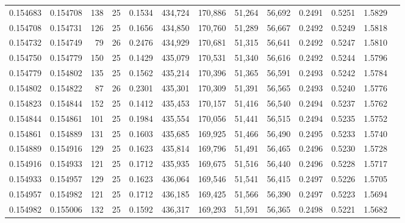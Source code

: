 \begin{tabular}{rrrrrrrrrrrrr}
0.154683 & 0.154708 & 138 &  25 &                                     0.1534 & 434,724 & 170,886 &  51,264 &  56,692 & 0.2491 & 0.5251 & 1.5829 \\
0.154708 & 0.154731 & 126 &  25 &                                     0.1656 & 434,850 & 170,760 &  51,289 &  56,667 & 0.2492 & 0.5249 & 1.5818 \\
0.154732 & 0.154749 &  79 &  26 &                                     0.2476 & 434,929 & 170,681 &  51,315 &  56,641 & 0.2492 & 0.5247 & 1.5810 \\
0.154750 & 0.154779 & 150 &  25 &                                     0.1429 & 435,079 & 170,531 &  51,340 &  56,616 & 0.2492 & 0.5244 & 1.5796 \\
0.154779 & 0.154802 & 135 &  25 &                                     0.1562 & 435,214 & 170,396 &  51,365 &  56,591 & 0.2493 & 0.5242 & 1.5784 \\
0.154802 & 0.154822 &  87 &  26 &                                     0.2301 & 435,301 & 170,309 &  51,391 &  56,565 & 0.2493 & 0.5240 & 1.5776 \\
0.154823 & 0.154844 & 152 &  25 &                                     0.1412 & 435,453 & 170,157 &  51,416 &  56,540 & 0.2494 & 0.5237 & 1.5762 \\
0.154844 & 0.154861 & 101 &  25 &                                     0.1984 & 435,554 & 170,056 &  51,441 &  56,515 & 0.2494 & 0.5235 & 1.5752 \\
0.154861 & 0.154889 & 131 &  25 &                                     0.1603 & 435,685 & 169,925 &  51,466 &  56,490 & 0.2495 & 0.5233 & 1.5740 \\
0.154889 & 0.154916 & 129 &  25 &                                     0.1623 & 435,814 & 169,796 &  51,491 &  56,465 & 0.2496 & 0.5230 & 1.5728 \\
0.154916 & 0.154933 & 121 &  25 &                                     0.1712 & 435,935 & 169,675 &  51,516 &  56,440 & 0.2496 & 0.5228 & 1.5717 \\
0.154933 & 0.154957 & 129 &  25 &                                     0.1623 & 436,064 & 169,546 &  51,541 &  56,415 & 0.2497 & 0.5226 & 1.5705 \\
0.154957 & 0.154982 & 121 &  25 &                                     0.1712 & 436,185 & 169,425 &  51,566 &  56,390 & 0.2497 & 0.5223 & 1.5694 \\
0.154982 & 0.155006 & 132 &  25 &                                     0.1592 & 436,317 & 169,293 &  51,591 &  56,365 & 0.2498 & 0.5221 & 1.5682 \\

\end{tabular}
